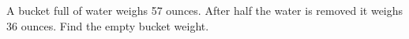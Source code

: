 A bucket full of water weighs 57 ounces. After half the water is removed it weighs 36 ounces. Find the empty bucket weight.
